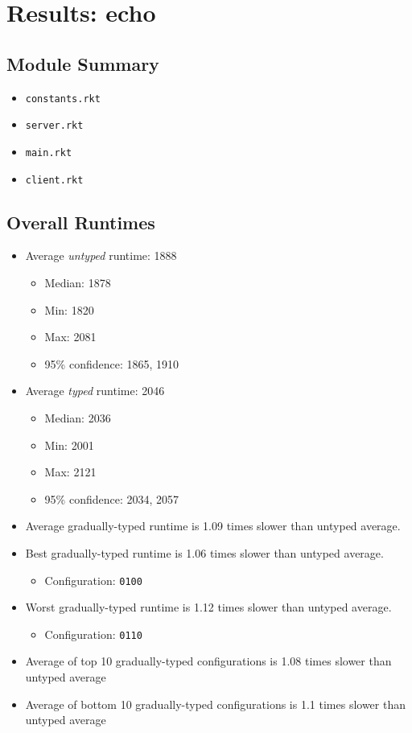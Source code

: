 \documentclass{article}
\newcommand{\mono}[1]{\texttt{#1}}
\begin{document}
\section{Results: echo}

\subsection{Module Summary}
\begin{itemize}
\item \mono{constants.rkt}
\item \mono{server.rkt}
\item \mono{main.rkt}
\item \mono{client.rkt}\end{itemize}

\subsection{Overall Runtimes}
\begin{itemize}
\item Average \emph{untyped} runtime: 1888
  \begin{itemize}
  \item Median: 1878
  \item Min: 1820
  \item Max: 2081
  \item 95\% confidence: 1865, 1910
  \end{itemize}
\item Average \emph{typed} runtime: 2046
  \begin{itemize}
  \item Median: 2036
  \item Min: 2001
  \item Max: 2121
  \item 95\% confidence: 2034, 2057
  \end{itemize}
\item Average gradually-typed runtime is 1.09 times slower than untyped average.
\item Best gradually-typed runtime is 1.06 times slower than untyped average.
\begin{itemize}\item Configuration: \mono{0100}\end{itemize}
\item Worst gradually-typed runtime is 1.12 times slower than untyped average.
\begin{itemize}\item Configuration: \mono{0110}\end{itemize}
\item Average of top 10 gradually-typed configurations is 1.08 times slower than untyped average
\item Average of bottom 10 gradually-typed configurations is 1.1 times slower than untyped average
\end{itemize}
\end{document}
